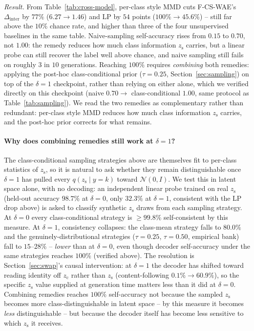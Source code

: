 \documentclass[10pt,letterpaper]{article}
\newcommand{\ours}{F-CS-WAE}
\newcommand{\zc}{z_{\mathrm{c}}}
\newcommand{\zs}{z_{\mathrm{s}}}
\begin{document}
\emph{Result.} From Table~\ref{tab:cross-model}, per-class style MMD cuts
\ours{}'s $\Delta_{\mathrm{inter}}$ by $77\%$ ($6.27\to1.46$) and LP by $54$
points ($100\%\to45.6\%$) -- still far above the $10\%$ chance rate, and
higher than three of the four unsupervised baselines in the same table.
Naive-sampling self-accuracy rises from $0.15$ to $0.70$, not $1.00$: the
remedy reduces how much class information $\zs$ carries, but a linear probe
can still recover the label well above chance, and naive sampling still
fails on roughly $3$ in $10$ generations. Reaching $100\%$ requires
\emph{combining} both remedies: applying the post-hoc class-conditional
prior ($\tau{=}0.25$, Section~\ref{sec:sampling}) on top of the $\delta{=}1$
checkpoint, rather than relying on either alone, which we verified directly
on this checkpoint (naive $0.70\to$ class-conditional $1.00$, same protocol
as Table~\ref{tab:sampling}). We read the two remedies as complementary
rather than redundant: per-class style MMD reduces how much class
information $\zs$ carries, and the post-hoc prior corrects for what
remains.

\paragraph{Why does combining remedies still work at $\delta{=}1$?} The
class-conditional sampling strategies above are themselves fit to per-class
statistics of $\zs$, so it is natural to ask whether they remain
distinguishable once $\delta{=}1$ has pulled every $q(\zs\mid y{=}k)$ toward
$\mathcal N(0,I)$. We test this in latent space alone, with no decoding: an
independent linear probe trained on real $\zs$ (held-out accuracy $98.7\%$
at $\delta{=}0$, only $32.3\%$ at $\delta{=}1$, consistent with the LP drop
above) is asked to classify synthetic $\zs$ draws from each sampling
strategy. At $\delta{=}0$ every class-conditional strategy is $\geq99.8\%$
self-consistent by this measure. At $\delta{=}1$, consistency collapses:
the class-mean strategy falls to $80.0\%$ and the genuinely-distributional
strategies ($\tau{=}0.25$, $\tau{=}0.50$, empirical bank) fall to
$15$--$28\%$ -- \emph{lower} than at $\delta{=}0$, even though decoder
self-accuracy under the same strategies reaches $100\%$ (verified above).
The resolution is Section~\ref{sec:swap}'s causal intervention: at
$\delta{=}1$ the decoder has shifted toward reading identity off $\zc$
rather than $\zs$ (content-following $0.1\%\to60.9\%$), so the specific
$\zs$ value supplied at generation time matters less than it did at
$\delta{=}0$. Combining remedies reaches $100\%$ self-accuracy not because
the sampled $\zs$ becomes more class-distinguishable in latent space -- by
this measure it becomes \emph{less} distinguishable -- but because the
decoder itself has become less sensitive to which $\zs$ it receives.
\end{document}
